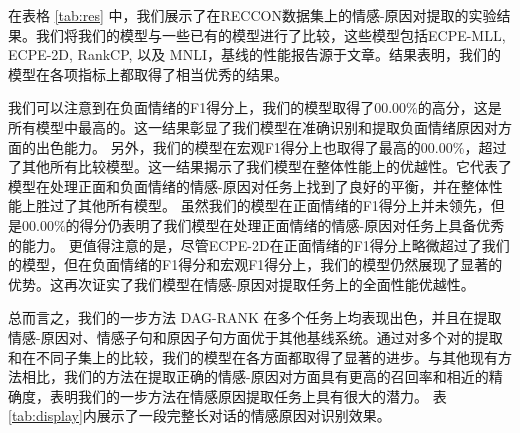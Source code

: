 在表格 \ref{tab:res} 中，我们展示了在RECCON数据集上的情感-原因对提取的实验结果。我们将我们的模型与一些已有的模型进行了比较，这些模型包括ECPE-MLL, ECPE-2D, RankCP, 以及 MNLI，基线的性能报告源于文章\cite{reccon}。结果表明，我们的模型在各项指标上都取得了相当优秀的结果。

我们可以注意到在负面情绪的F1得分上，我们的模型取得了$00.00\%$的高分，这是所有模型中最高的。这一结果彰显了我们模型在准确识别和提取负面情绪原因对方面的出色能力。
另外，我们的模型在宏观F1得分上也取得了最高的$00.00\%$，超过了其他所有比较模型。这一结果揭示了我们模型在整体性能上的优越性。它代表了模型在处理正面和负面情绪的情感-原因对任务上找到了良好的平衡，并在整体性能上胜过了其他所有模型。
虽然我们的模型在正面情绪的F1得分上并未领先，但是$00.00\%$的得分仍表明了我们模型在处理正面情绪的情感-原因对任务上具备优秀的能力。
更值得注意的是，尽管ECPE-2D在正面情绪的F1得分上略微超过了我们的模型，但在负面情绪的F1得分和宏观F1得分上，我们的模型仍然展现了显著的优势。这再次证实了我们模型在情感-原因对提取任务上的全面性能优越性。

总而言之，我们的一步方法  DAG-RANK  在多个任务上均表现出色，并且在提取情感-原因对、情感子句和原因子句方面优于其他基线系统。通过对多个对的提取和在不同子集上的比较，我们的模型在各方面都取得了显著的进步。与其他现有方法相比，我们的方法在提取正确的情感-原因对方面具有更高的召回率和相近的精确度，表明我们的一步方法在情感原因提取任务上具有很大的潜力。
表\ref{tab:display}内展示了一段完整长对话的情感原因对识别效果。


